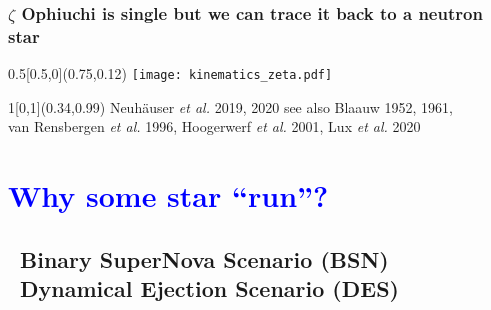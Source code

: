 \documentclass[xcolor=dvipsnames,professionalfonts, aspectratio=169]{beamer}
\begin{document}
\begin{frame}
  \frametitle{\textcolor{whiteish}{$\zeta$ Ophiuchi is single but we can trace it back to a neutron star}}

  \begin{textblock}{0.5}[0.5,0](0.75,0.12)
    \texttt{[image: kinematics\_zeta.pdf]}
  \end{textblock}




  \begin{textblock}{1}[0,1](0.34,0.99)
    \textcolor{gray!50}{\tiny Neuh\"auser \emph{et al.} 2019, 2020 see
      also Blaauw 1952, 1961,\\[-7pt]
      van Rensbergen \emph{et al.} 1996,
      Hoogerwerf \emph{et al.} 2001, Lux \emph{et al.} 2020}\hfill\,
  \end{textblock}

\end{frame}
\egroup



\section{\textcolor{Blue}{Why some star ``run''?}}
\subsection{\textcolor{gray!40}{\textbullet~Binary SuperNova Scenario
  (BSN)} \\\textcolor{Blue}{\textbullet}~Dynamical Ejection Scenario (DES)}
\end{document}
